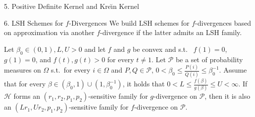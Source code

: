 \documentclass[final]{beamer}
\newcommand{\kr}{Kre\u{\i}n\xspace}
\newlength{\onecolwid}
\begin{document}
\begin{frame}[t]
\begin{columns}[t]
\begin{column}{\onecolwid}
\begin{block}{5. Positive Definite Kernel and \kr Kernel}
\end{block}

\begin{block}{6. LSH Schemes for $ f $-Divergences}
	We build LSH schemes for $ f $-divergences based on approximation via 
	another $ 
	f $-divergence if the latter admits an LSH family. 
	
	
	
	
	
	Let $ \beta_0\in (0,1),L,U>0 $ and let $ f $ and $ g $ be convex and s.t.\
	 $ f(1)=0 $, $ g(1)=0 $, and $f(t), g(t)>0 $ for every $ 
	t\ne 1 
	$. 
	Let $ \mathcal{P} $ be a set of probability measures
	on 
	 $ \Omega $ s.t.\ for every $ i\in 
	\Omega $ and $ 
	P, Q\in \mathcal{P} $, $
	0< \beta_0\le \frac{P(i)}{Q(i)} \le \beta_0^{-1}
	$.
	Assume that for every $ \beta\in 
	(\beta_0, 1)\cup (1,\beta_0^{-1}) $, it holds that
	$
	0<L\le \frac{f(\beta)}{g(\beta)} \le U < \infty$.
	If $ \mathcal{H} $ forms 
	an $ (r_1, r_2, p_1,p_2) $-sensitive family for $ 
	g 
	$-divergence on $ \mathcal{P} $, then it is also an  
	$ (Lr_1, 
	Ur_2, p_1,p_2)  
	$-sensitive family for $ f $-divergence on $ \mathcal{P} $.
	

\end{block}
\end{column}
\end{columns}
\end{frame}
\end{document}
